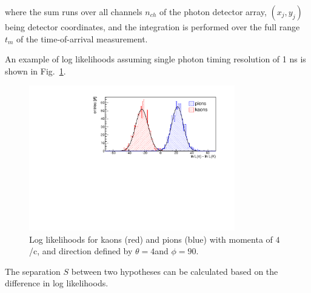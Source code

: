 \noindent where the sum runs over all channels $n_{ch}$ of the photon detector array, $(x_{j}, y_{j})$ being detector coordinates, and the integration is performed over the full range $t_{m}$ of the time-of-arrival measurement.

An example of log likelihoods assuming single photon timing resolution of 1 ns is shown in Fig.~\ref{pic:sepTI}.

\begin{figure}[!h]
\centering
\includegraphics[width=0.8\textwidth]{pics/ll.pdf} \hspace{0.5cm} %
\caption{\label{pic:sepTI}
Log likelihoods for kaons (red) and pions (blue) with momenta of $4$ {\gev}/c, and direction defined by $\theta = 4$\mydeg and $\phi = 90$\mydeg. 
}
\end{figure}

The separation $S$ between two hypotheses can be calculated based on the difference in log likelihoods.

